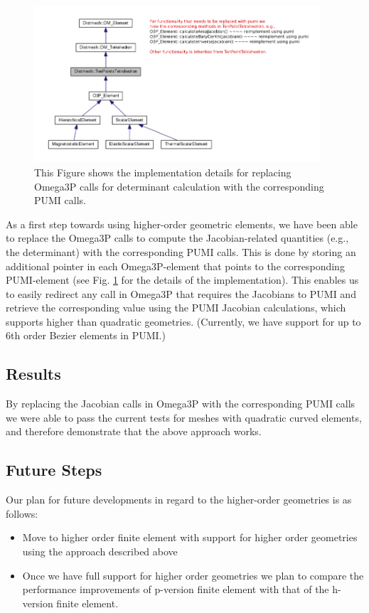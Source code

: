\documentclass[review,12pt]{elsarticle_summary_report}
\begin{document}
\begin{figure}[!ph]
\centering
\includegraphics[width=0.95\textwidth]{hide_ten_point_tet.png}
\caption{\label{imp} This Figure shows the implementation details for replacing Omega3P calls for determinant calculation with the corresponding PUMI calls.}
\end{figure}
As a first step towards using higher-order geometric elements, we have been able to replace the Omega3P calls to compute the Jacobian-related quantities (e.g., the determinant) with the corresponding PUMI calls. This is done by storing an additional pointer in each Omega3P-element that points to the corresponding  PUMI-element (see Fig. \ref{imp} for the details of the implementation).
This enables us to easily redirect any call in Omega3P that requires the Jacobians to PUMI and retrieve the corresponding value using the PUMI Jacobian calculations, which supports higher than quadratic geometries. (Currently, we have support for up to 6th order Bezier elements in PUMI.)

\subsection{Results}
By replacing the Jacobian calls in Omega3P with the corresponding PUMI calls we were able to pass the current tests for meshes with quadratic curved  elements, and therefore demonstrate that the above approach works.

\subsection{\label{high_order_geom_future} Future Steps}
Our plan for future developments in regard to the higher-order geometries is as follows:

\begin{itemize}
  \item Move to higher order finite element with support for higher order geometries using the approach described above
  \item Once we have full support for higher order geometries we plan to compare the performance improvements of p-version finite element with that of the h-version finite element. 
\end{itemize}
\end{document}
